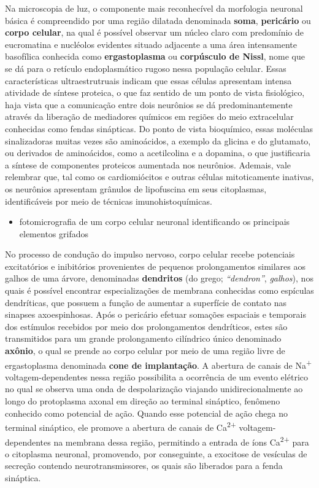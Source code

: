 \documentclass[
]{book}
\providecommand{\tightlist}{%
  \setlength{\itemsep}{0pt}\setlength{\parskip}{0pt}}
\theoremstyle{definition}
\theoremstyle{definition}
\theoremstyle{definition}
\theoremstyle{definition}
\theoremstyle{remark}
\begin{document}
Na microscopia de luz, o componente mais reconhecível da morfologia neuronal básica é compreendido por uma região dilatada denominada \textbf{soma}, \textbf{pericário} ou \textbf{corpo celular}, na qual é possível observar um núcleo claro com predomínio de eucromatina e nucléolos evidentes situado adjacente a uma área intensamente basofílica conhecida como \textbf{ergastoplasma} ou \textbf{corpúsculo de Nissl}, nome que se dá para o retículo endoplasmático rugoso nessa população celular. Essas características ultraestrutruais indicam que essas células apresentam intensa atividade de síntese proteica, o que faz sentido de um ponto de vista fisiológico, haja vista que a comunicação entre dois neurônios se dá predominantemente através da liberação de mediadores químicos em regiões do meio extracelular conhecidas como fendas sinápticas. Do ponto de vista bioquímico, essas moléculas sinalizadoras muitas vezes são aminoácidos, a exemplo da glicina e do glutamato, ou derivados de aminoácidos, como a acetilcolina e a dopamina, o que justificaria a síntese de componentes proteicos aumentada nos neurônios. Ademais, vale relembrar que, tal como os cardiomiócitos e outras células mitoticamente inativas, os neurônios apresentam grânulos de lipofuscina em seus citoplasmas, identificáveis por meio de técnicas imunohistoquímicas.

\begin{itemize}
\tightlist
\item
  fotomicrografia de um corpo celular neuronal identificando os principais elementos grifados
\end{itemize}

No processo de condução do impulso nervoso, corpo celular recebe potenciais excitatórios e inibitórios provenientes de pequenos prolongamentos similares aos galhos de uma árvore, denominadas \textbf{dendritos} (do grego; \emph{``dendron''}, \emph{galhos}), nos quais é possível encontrar especializações de membrana conhecidas como espículas dendríticas, que possuem a função de aumentar a superfície de contato nas sinapses axoespinhosas. Após o pericário efetuar somações espaciais e temporais dos estímulos recebidos por meio dos prolongamentos dendríticos, estes são transmitidos para um grande prolongamento cilíndrico único denominado \textbf{axônio}, o qual se prende ao corpo celular por meio de uma região livre de ergastoplasma denominada \textbf{cone de implantação}. A abertura de canais de Na\textsuperscript{+} voltagem-dependentes nessa região possibilita a ocorrência de um evento elétrico no qual se observa uma onda de despolarização viajando unidirecionalmente ao longo do protoplasma axonal em direção ao terminal sináptico, fenômeno conhecido como potencial de ação. Quando esse potencial de ação chega no terminal sináptico, ele promove a abertura de canais de Ca\textsuperscript{2+} voltagem-dependentes na membrana dessa região, permitindo a entrada de íons Ca\textsuperscript{2+} para o citoplasma neuronal, promovendo, por conseguinte, a exocitose de vesículas de secreção contendo neurotransmissores, os quais são liberados para a fenda sináptica.
\end{document}
